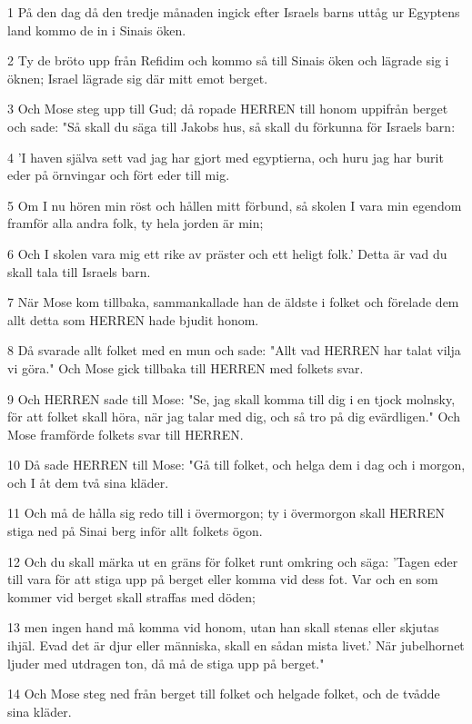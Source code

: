 \par 1 På den dag då den tredje månaden ingick efter Israels barns uttåg ur Egyptens land kommo de in i Sinais öken.
\par 2 Ty de bröto upp från Refidim och kommo så till Sinais öken och lägrade sig i öknen; Israel lägrade sig där mitt emot berget.
\par 3 Och Mose steg upp till Gud; då ropade HERREN till honom uppifrån berget och sade: "Så skall du säga till Jakobs hus, så skall du förkunna för Israels barn:
\par 4 'I haven själva sett vad jag har gjort med egyptierna, och huru jag har burit eder på örnvingar och fört eder till mig.
\par 5 Om I nu hören min röst och hållen mitt förbund, så skolen I vara min egendom framför alla andra folk, ty hela jorden är min;
\par 6 Och I skolen vara mig ett rike av präster och ett heligt folk.' Detta är vad du skall tala till Israels barn.
\par 7 När Mose kom tillbaka, sammankallade han de äldste i folket och förelade dem allt detta som HERREN hade bjudit honom.
\par 8 Då svarade allt folket med en mun och sade: "Allt vad HERREN har talat vilja vi göra." Och Mose gick tillbaka till HERREN med folkets svar.
\par 9 Och HERREN sade till Mose: "Se, jag skall komma till dig i en tjock molnsky, för att folket skall höra, när jag talar med dig, och så tro på dig evärdligen." Och Mose framförde folkets svar till HERREN.
\par 10 Då sade HERREN till Mose: "Gå till folket, och helga dem i dag och i morgon, och I åt dem två sina kläder.
\par 11 Och må de hålla sig redo till i övermorgon; ty i övermorgon skall HERREN stiga ned på Sinai berg inför allt folkets ögon.
\par 12 Och du skall märka ut en gräns för folket runt omkring och säga: 'Tagen eder till vara för att stiga upp på berget eller komma vid dess fot. Var och en som kommer vid berget skall straffas med döden;
\par 13 men ingen hand må komma vid honom, utan han skall stenas eller skjutas ihjäl. Evad det är djur eller människa, skall en sådan mista livet.' När jubelhornet ljuder med utdragen ton, då må de stiga upp på berget."
\par 14 Och Mose steg ned från berget till folket och helgade folket, och de tvådde sina kläder.
